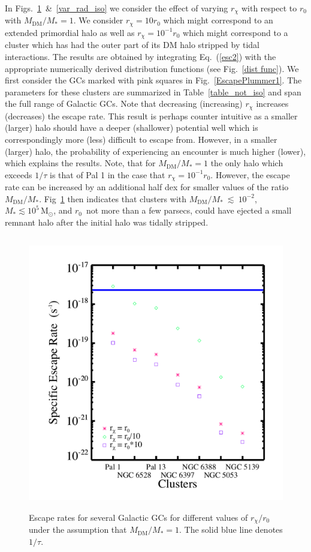 \documentclass[aps,floatfix,prd,showpacs]{revtex4}
\newcommand{\rx}{r_\chi}
\newcommand{\MDM}{M_{\mathrm{DM}}}
\newcommand{\Msun}{\textrm{M}_\odot}
\begin{document}
In Figs.~\ref{var_rad_not_iso}~\&~\ref{var_rad_iso} we consider the effect of varying $\rx$ with respect to $r_0$ with $\MDM/M_* = 1$.  We consider $\rx = 10r_0$ which might correspond to an extended primordial halo as well as $\rx = 10^{-1}r_0$ which might correspond to a cluster which has had the outer part of its DM halo stripped by tidal interactions.  The results are obtained by integrating Eq.~(\ref{esc2}) with the appropriate numerically derived distribution functions (see Fig.~\ref{dist func}).  We first consider the GCs marked with pink squares in Fig.~\ref{EscapePlummer1}.  The parameters for these clusters are summarized in Table~\ref{table_not_iso} and span the full range of Galactic GCs.  Note that decreasing (increasing) $\rx$ increases (decreases) the escape rate.  This result is perhaps counter intuitive as a smaller (larger) halo should have a deeper (shallower) potential well which is correspondingly more (less) difficult to escape from.  However, in a smaller (larger) halo, the probability of experiencing an encounter is much higher (lower), which explains the results.  Note, that for $\MDM/M_* = 1$ the only halo which exceeds $1/\tau$ is that of Pal 1 in the case that $\rx = 10^{-1}r_0$.  However, the escape rate can be increased by an additional half dex for smaller values of the ratio $\MDM/M_*$.  Fig~\ref{var_rad_not_iso} then indicates that clusters with $\MDM/M_*~\lesssim~10^{-2}$, $M_* \lesssim 10^5\, \Msun$, and $r_0$~not more than a few parsecs, could have ejected a small remnant halo after the initial halo was tidally stripped.  
%
\begin{figure}[htp]
\centering
\includegraphics[width=12cm, height=12cm]{var_rad_not_iso}
\caption{Escape rates for several Galactic GCs for different values of $\rx/r_0$ under the assumption that $\MDM/M_* = 1$.  The solid blue line denotes $1/\tau$.}  
\label{var_rad_not_iso}
\end{figure}
\end{document}
